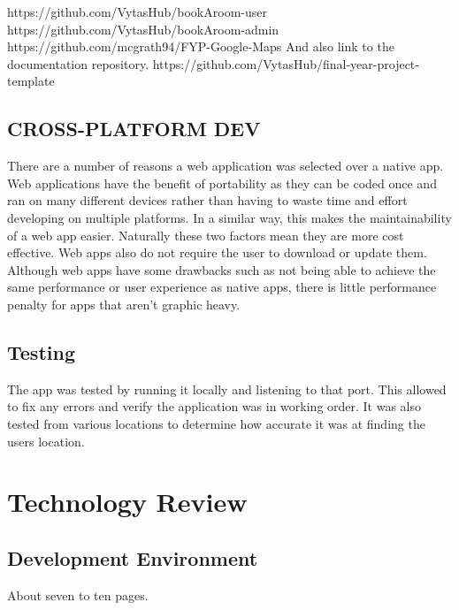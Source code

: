 https://github.com/VytasHub/bookAroom-user
https://github.com/VytasHub/bookAroom-admin
https://github.com/mcgrath94/FYP-Google-Maps
And also link to the documentation repository.
https://github.com/VytasHub/final-year-project-template



\section{CROSS-PLATFORM DEV}

There are a number of reasons a web application was selected over a native app. Web applications have the benefit of portability as they can be coded once and ran on many different devices rather than having to waste time and effort developing on multiple platforms. In a similar way, this makes the maintainability of a web app easier. Naturally these two factors mean they are more cost effective. Web apps also do not require the user to download or update them. Although web apps have some drawbacks such as not being able to achieve the same performance or user experience as native apps, there is little performance penalty for apps that aren't graphic heavy. 

\section{Testing}

The app was tested by running it locally and listening to that port. This allowed to fix any errors and verify the application was in working order. It was also tested from various locations to determine how accurate it was at finding the users location.




\chapter{Technology Review}
\section{Development Environment}
About seven to ten pages.
